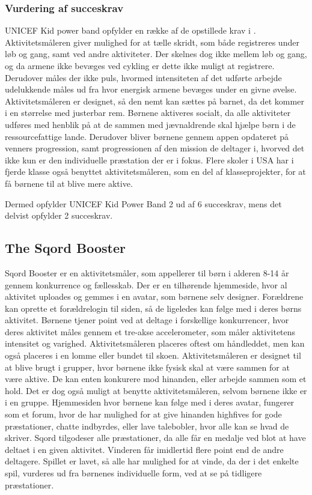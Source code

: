 \subsubsection{Vurdering af succeskrav}
UNICEF Kid power band opfylder en række af de opstillede krav i . Aktivitetsmåleren giver mulighed for at tælle skridt, som både registreres under løb og gang, samt ved andre aktiviteter. Der skelnes dog ikke mellem løb og gang, og da armene ikke bevæges ved cykling er dette ikke muligt at registrere. Derudover måles der ikke puls, hvormed intensiteten af det udførte arbejde udelukkende måles ud fra hvor energisk armene bevæges under en givne øvelse. Aktivitetsmåleren er designet, så den nemt kan sættes på barnet, da det kommer i en størrelse med justerbar rem.\citep{PowerManual2015} \newline
Børnene aktiveres socialt, da alle aktiviteter udføres med henblik på at de sammen med jævnaldrende skal hjælpe børn i de ressourcefattige lande. Derudover bliver børnene gennem appen opdateret på venners progression, samt progressionen af den mission de deltager i, hvorved det ikke kun er den individuelle præstation der er i fokus. Flere skoler i USA har i fjerde klasse også benyttet aktivitetsmåleren, som en del af klasseprojekter, for at få børnene til at blive mere aktive.\citep{PowerAbout2015}

Dermed opfylder UNICEF Kid Power Band 2 ud af 6 succeskrav, mens det delvist opfylder 2 succeskrav.

\subsection{The Sqord Booster}
Sqord Booster er en aktivitetsmåler, som appellerer til børn i alderen 8-14 år gennem konkurrence og fællesskab. Der er en tilhørende hjemmeside, hvor al aktivitet uploades og gemmes i en avatar, som børnene selv designer. Forældrene kan oprette et forældrelogin til siden, så de ligeledes kan følge med i deres børns aktivitet. Børnene tjener point ved at deltage i forskellige konkurrencer, hvor deres aktivitet måles gennem et tre-akse accelerometer, som måler aktivitetens intensitet og varighed. Aktivitetsmåleren placeres oftest om håndleddet, men kan også placeres i en lomme eller bundet til skoen. \newline
Aktivitetsmåleren er designet til at blive brugt i grupper, hvor børnene ikke fysisk skal at være sammen for at være aktive. De kan enten konkurere mod hinanden, eller arbejde sammen som et hold. Det er dog også muligt at benytte aktivitetsmåleren, selvom børnene ikke er i en gruppe. \newline
Hjemmesiden hvor børnene kan følge med i deres avatar, fungerer som et forum, hvor de har mulighed for at give hinanden highfives for gode præstationer, chatte indbyrdes, eller lave talebobler, hvor alle kan se hvad de skriver. \newline
Sqord tilgodeser alle præstationer, da alle får en medalje ved blot at have deltaet i en given aktivitet. Vinderen får imidlertid flere point end de andre deltagere. Spillet er lavet, så alle har mulighed for at vinde, da der i det enkelte spil, vurderes ud fra børnenes individuelle form, ved at se på tidligere præstationer.

